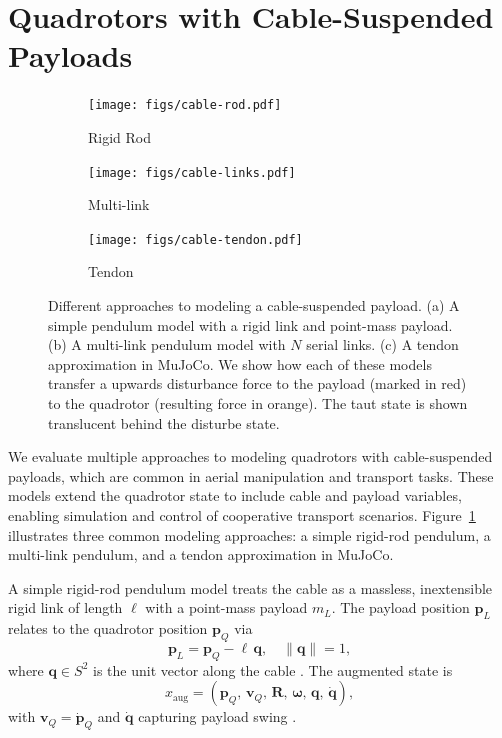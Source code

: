 \section{Quadrotors with Cable-Suspended Payloads}
\label{sec:quadrotor_with_payloads}
\begin{figure}

  \centering
  \begin{subfigure}[t]{0.3\textwidth}
    \centering
    \texttt{[image: figs/cable-rod.pdf]}
    \caption{Rigid Rod}
  \end{subfigure}
  \begin{subfigure}[t]{0.3\textwidth}
    \centering
    \texttt{[image: figs/cable-links.pdf]}
    \caption{Multi-link}
  \end{subfigure}
  \begin{subfigure}[t]{0.3\textwidth}
    \centering
    \texttt{[image: figs/cable-tendon.pdf]}
    \caption{Tendon}
  \end{subfigure}
  \caption[Cable modeling approaches]{Different approaches to modeling a cable-suspended payload. (a) A simple pendulum model with a rigid link and point-mass payload. (b) A multi-link pendulum model with \(N\) serial links. (c) A tendon approximation in MuJoCo. We show how each of these models transfer a upwards disturbance force to the payload (marked in red) to the quadrotor (resulting force in orange). The taut state is shown translucent behind the disturbe state.}
  \label{fig:cable_models}
\end{figure}
We evaluate multiple approaches to modeling quadrotors with cable-suspended payloads, which are common in aerial manipulation and transport tasks. These models extend the quadrotor state to include cable and payload variables, enabling simulation and control of cooperative transport scenarios. Figure~\ref{fig:cable_models} illustrates three common modeling approaches: a simple rigid-rod pendulum, a multi-link pendulum, and a tendon approximation in MuJoCo.

A simple rigid-rod pendulum model treats the cable as a massless, inextensible rigid link of length \(\ell\) with a point-mass payload \(m_L\). The payload position \(\mathbf{p}_L\) relates to the quadrotor position \(\mathbf{p}_Q\) via
\begin{equation}
\mathbf{p}_L = \mathbf{p}_Q - \ell\,\mathbf{q}, 
\quad
\|\mathbf{q}\| = 1,
\end{equation}
where \(\mathbf{q}\in S^2\) is the unit vector along the cable \cite{estevez_review_2024}. The augmented state is
\begin{equation}
x_{\mathrm{aug}} = (\mathbf{p}_Q,\,\mathbf{v}_Q,\,\mathbf{R},\,\boldsymbol{\omega},\,\mathbf{q},\,\dot{\mathbf{q}}),
\end{equation}
with \(\mathbf{v}_Q = \dot{\mathbf{p}}_Q\) and \(\dot{\mathbf{q}}\) capturing payload swing \cite{Wahba2024}.

